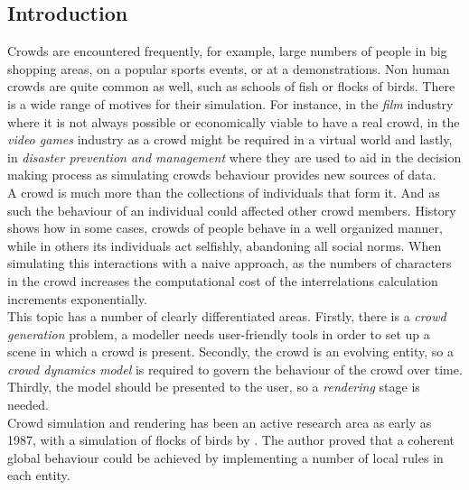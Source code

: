 \documentclass[6pt]{article} %
\begin{document}
\setcounter{page}{1} %
\columnsep 25.0pt %
\begin{multicols}{2} %

\section{Introduction}
\label{intro}

Crowds are encountered frequently, for example, large numbers of people in big shopping areas, on a popular sports events, or at a demonstrations.
Non human crowds are quite common as well, such as schools of fish or flocks of birds.
There is a wide range of motives for their simulation.
For instance, in the \textit{film} industry where it is not always possible or economically viable to have a real crowd, in the \textit{video games} industry as a crowd might be required in a virtual world and lastly, in \textit{disaster prevention and management} where they are used to aid in the decision making process as simulating crowds behaviour provides new sources of data.\\

A crowd is much more than the collections of individuals that form it.
And as such the behaviour of an individual could affected other crowd members.
History shows how in some cases, crowds of people behave in a well organized manner, while in others its individuals act selfishly, abandoning all social norms.
When simulating this interactions with a naive approach, as the numbers of characters in the crowd increases the computational cost of the interrelations calculation increments exponentially.\\

This topic has a number of clearly differentiated areas.
Firstly, there is a \textit{crowd generation} problem, a modeller needs user-friendly tools in order to set up a scene in which a crowd is present.
Secondly, the crowd is an evolving entity, so a \textit{crowd dynamics model} is required to govern the behaviour of the crowd over time.
Thirdly, the model should be presented to the user, so a \textit{rendering} stage is needed.\\

Crowd simulation and rendering has been an active research area as early as 1987, with a simulation of flocks of birds by \cite{Reynolds1987}.
The author proved that a coherent global behaviour could be achieved by implementing a number of local rules in each entity.


\end{multicols}
\end{document}
